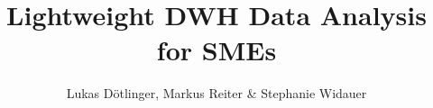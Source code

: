 \usepackage{lmodern}
\usepackage[english]{babel}

\usepackage{fontspec}

\usepackage{multicol}

\usepackage{listings}

\usepackage{graphicx}
\graphicspath{{assets/}}

\title{Lightweight DWH Data Analysis for SMEs}
\author{Lukas Dötlinger, Markus Reiter \& Stephanie Widauer}
